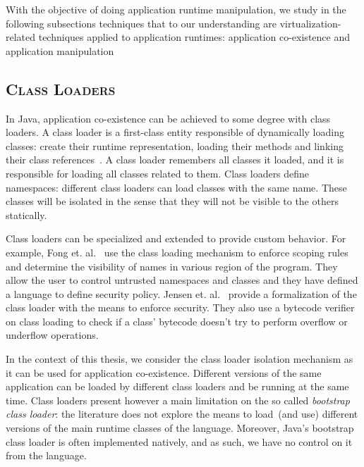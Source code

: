 With the objective of doing application runtime manipulation, we study in the following subsections techniques that to our understanding are virtualization-related techniques applied to application runtimes: application co-existence and application manipulation%


\subsection*{\textsc{Class Loaders}}
In Java, application co-existence can be achieved to some degree with class loaders. A class loader is a first-class entity responsible of dynamically loading classes: create their runtime representation, loading their methods and linking their class references~\cite{Lian98a}. A class loader remembers all classes it loaded, and it is responsible for loading all classes related to  them. Class loaders define namespaces: different class loaders can load classes with the same name. These classes will be isolated in the sense that they will not be visible to the others statically.

Class loaders can be specialized and extended to provide custom behavior. For example, Fong et. al.~\cite{Fong10a} use the class loading mechanism to enforce scoping rules and determine the visibility of names in various region of the program. They allow the user to control untrusted
namespaces and classes and they have defined a language to define security policy. Jensen et. al.~\cite{Jens98a} provide a formalization of the class loader with the means to enforce security. They also use a bytecode verifier on class loading to check if a class' bytecode doesn't try to perform overflow or underflow operations.

In the context of this thesis, we consider the class loader isolation mechanism as it can be used for application co-existence. Different versions of the same application can be loaded by different class loaders and be running at the same time. Class loaders present however a main limitation on the so called \emph{bootstrap class loader}: the literature does not explore the means to load~(and use) different versions of the main runtime classes of the language. Moreover, Java's bootstrap class loader is often implemented natively, and as such, we have no control on it from the language.

